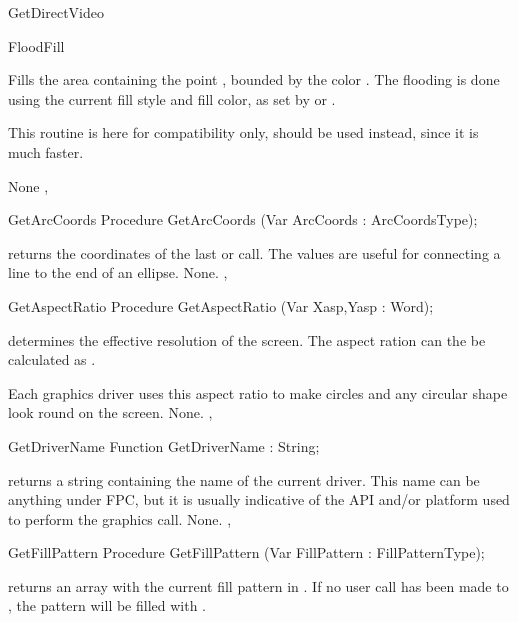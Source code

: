 \begin{function}{GetDirectVideo}
\begin{procedure}{FloodFill}
\Description

Fills the area containing the point , bounded by the color
. The flooding is done using the current fill style
and fill color, as set by  or .

This routine is here for compatibility only,  should be
used instead, since it is much faster.

\Errors
None
\SeeAlso
{},
\end{procedure}

\begin{procedure}{GetArcCoords}
\Declaration
Procedure GetArcCoords (Var ArcCoords : ArcCoordsType);

\Description
{} returns the coordinates of the last  or
 call. The values are useful for connecting a line to
the end of an ellipse.
\Errors
None.
\SeeAlso
{}, 
\end{procedure}

\begin{procedure}{GetAspectRatio}
\Declaration
Procedure GetAspectRatio (Var Xasp,Yasp : Word);

\Description
{} determines the effective resolution of the screen. The aspect ration can
the be calculated as .

Each graphics driver uses this aspect ratio to make circles and any circular
shape look round on the screen.
\Errors
None.
\SeeAlso
{},
\end{procedure}


\begin{function}{GetDriverName}
\Declaration
Function GetDriverName  : String;

\Description
{} returns a string containing the name of the
current driver. This name can be anything under FPC, but it is
usually indicative of the API and/or platform used to perform the
graphics call.
\Errors
None.
\SeeAlso
{}, 
\end{function}

\begin{procedure}{GetFillPattern}
\Declaration
Procedure GetFillPattern (Var FillPattern : FillPatternType);

\Description
{} returns an array with the current fill pattern in .
If no user call has been made to , the pattern will be
filled with .


\end{procedure}
\end{function}

